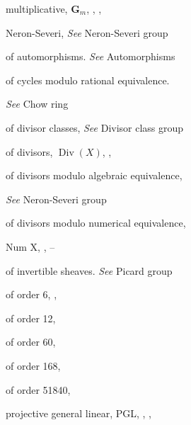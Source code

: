 {{\noindent\hspace*{7.5bp}multiplicative, $\mathbf G_m$, , , \par
\noindent\hspace*{7.5bp}Neron-Severi, \emph{See} Neron-Severi group\par
\noindent\hspace*{7.5bp}of automorphisms. \emph{See} Automorphisms\par
\noindent\hspace*{7.5bp}of cycles modulo rational equivalence.\par
\noindent\hspace*{15.0bp}\emph{See} Chow ring\par
\noindent\hspace*{7.5bp}of divisor classes, \emph{See} Divisor class group\par
\noindent\hspace*{7.5bp}of divisors, $\operatorname{Div}(X)$, , \par
\noindent\hspace*{7.5bp}of divisors modulo algebraic equivalence,\par
\noindent\hspace*{15.0bp}\emph{See} Neron-Severi group\par
\noindent\hspace*{7.5bp}of divisors modulo numerical equivalence,\par
\noindent\hspace*{15.0bp}Num X, , --\par
\noindent\hspace*{7.5bp}of invertible sheaves. \emph{See} Picard group\par
\noindent\hspace*{7.5bp}of order 6, , \par
\noindent\hspace*{7.5bp}of order 12, \par
\noindent\hspace*{7.5bp}of order 60, \par
\noindent\hspace*{7.5bp}of order 168, \par
\noindent\hspace*{7.5bp}of order 51840, \par
\noindent\hspace*{7.5bp}projective general linear, PGL, , ,\par
}}
